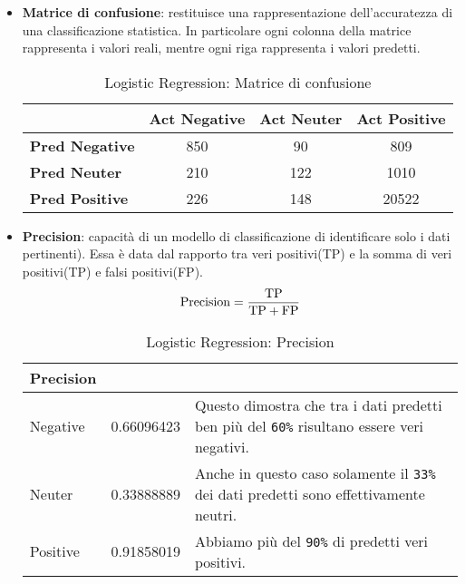 			\begin{itemize}
				\item \textbf{Matrice di confusione}: restituisce una rappresentazione dell'accuratezza di una classificazione statistica. In particolare ogni colonna della matrice rappresenta i valori reali, mentre ogni riga rappresenta i valori predetti.
				
					\begin{table} [H]
						\caption{Logistic Regression: Matrice di confusione}
						\label{tab:matriceConfusioneLogisticRegression}
						\centering
						\begin{tabular}{lccc}
							\toprule 
							& \textbf{Act Negative} & \textbf{Act Neuter}	& \textbf{Act Positive}\\
							\midrule
							\textbf{Pred Negative}  & 850 & 90 & 809\\
							\textbf{Pred Neuter} & 210 & 122 & 1010\\
							\textbf{Pred Positive} & 226 & 148 & 20522\\
							\bottomrule
						\end{tabular}
					\end{table}
			
				\item \textbf{Precision}: capacità di un modello di classificazione di identificare solo i dati pertinenti). Essa è data dal rapporto tra veri positivi(TP) e la somma di veri positivi(TP) e falsi positivi(FP).
					\begin{equation}
					\text{Precision} = \frac{\text{TP}}{\text{TP} + \text{FP}} \\
					\end{equation}
					
					\begin{table} [H]
						\caption{Logistic Regression: Precision}
						\label{tab:precisionLogisticRegression}
						\centering
						\begin{tabular}{llp{}}
							\toprule 
							\textbf{Precision}	\\
							\midrule
							Negative  & 0.66096423  & Questo dimostra che tra i dati predetti ben più del \verb|60%| risultano essere veri negativi.\\
							Neuter & 0.33888889 & Anche in questo caso solamente il \verb|33%| dei dati predetti sono effettivamente neutri.\\
							Positive & 0.91858019 & Abbiamo più del \verb|90%| di predetti veri positivi.\\
							\bottomrule
						\end{tabular}
					\end{table}
				

\end{itemize}
